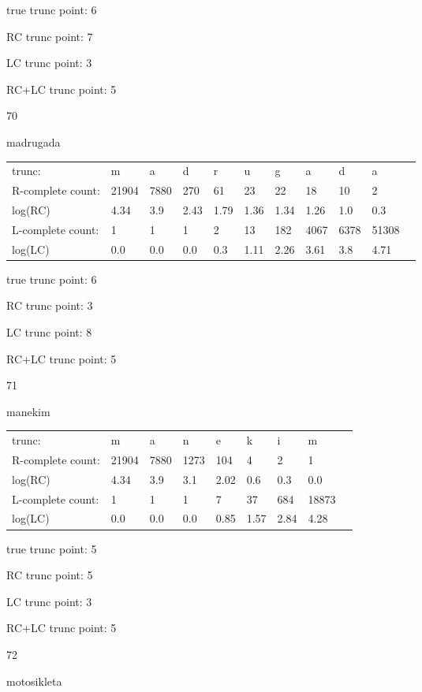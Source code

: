 \documentclass{article}
\begin{document}
true trunc point: 6

RC trunc point: 7

LC trunc point: 3

RC+LC trunc point: 5

\vspace{1em}

70

madrugada

\begin{tabular}{l|llllllllll}
trunc: & m & a & d & r & u & g & a & d & a & \\ 
R-complete count: & 21904 & 7880 & 270 & 61 & 23 & 22 & 18 & 10 & 2 & \\ 
log(RC) & 4.34 & 3.9 & 2.43 & 1.79 & 1.36 & 1.34 & 1.26 & 1.0 & 0.3 & \\ 
L-complete count: & 1 & 1 & 1 & 2 & 13 & 182 & 4067 & 6378 & 51308 & \\ 
log(LC) & 0.0 & 0.0 & 0.0 & 0.3 & 1.11 & 2.26 & 3.61 & 3.8 & 4.71 & \\ 
\end{tabular}

true trunc point: 6

RC trunc point: 3

LC trunc point: 8

RC+LC trunc point: 5

\vspace{1em}

71

manekim

\begin{tabular}{l|llllllll}
trunc: & m & a & n & e & k & i & m & \\ 
R-complete count: & 21904 & 7880 & 1273 & 104 & 4 & 2 & 1 & \\ 
log(RC) & 4.34 & 3.9 & 3.1 & 2.02 & 0.6 & 0.3 & 0.0 & \\ 
L-complete count: & 1 & 1 & 1 & 7 & 37 & 684 & 18873 & \\ 
log(LC) & 0.0 & 0.0 & 0.0 & 0.85 & 1.57 & 2.84 & 4.28 & \\ 
\end{tabular}

true trunc point: 5

RC trunc point: 5

LC trunc point: 3

RC+LC trunc point: 5

\vspace{1em}

72

motosikleta
\end{document}
